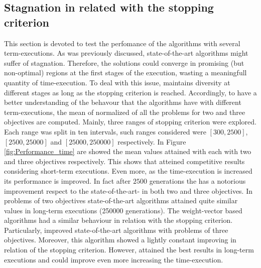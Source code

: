\begin{figure}[t]
\centering

\label{fig:Diversity_3obj}
\end{figure}


%

\subsection{Stagnation in \MOEAS{} related with the stopping criterion}


This section is devoted to test the perfomance of the algorithms with several term-executions.
%
As was previously discussed, state-of-the-art algorithms might suffer of stagnation.
%
Therefore, the solutions could converge in promising (but non-optimal) regions at the first stages of the execution, wasting a meaningfull quantity of time-execution.
%
To deal with this issue, \VSDMOEA{} maintains diversity at different stages as long as the stopping criterion is reached.
%
Accordingly, to have a better understanding of the behavour that the algorithms have with different term-executions, the mean of normalized \HV{} of all the problems for two and three objectives are computed.
%
Mainly, three ranges of stopping criterion were explored.
%
Each range was split in ten intervals, such ranges considered were $[300, 2500]$, $[2500, 25000]$ and $[25000, 250000]$ respectively.
%
In Figure \ref{fig:Performance_time} are showed the mean \HV{} values attained with each \MOEA{} with two and three objectives respectively.
%
This shows that \VSDMOEA{} atteined competitive results considering short-term executions.
%
Even more, as the time-execution is increased its performance is improved.
%
In fact after $2500$ generations the \VSDMOEA{} has a notorious improvement respect to the state-of-the-art-\MOEAS{} in both two and three objectives.
%
In problems of two objectives state-of-the-art algorithms attained quite similar \HV{} values in long-term executions (250000 generations).
%
The weight-vector based algorithms had a similar behaviour in relation with the stopping criterion.
%
Particularly, \RMOEA{} improved state-of-the-art algorithms with problems of three objectives.
%
Moreover, this algorithm showed a lightly constant improving in relation of the stopping criterion.
%
However, \VSDMOEA{} attained the best results in long-term executions and could improve even more increasing the time-execution.
%



